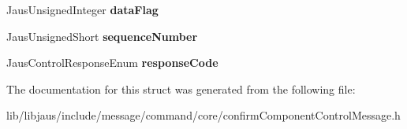 \begin{DoxyCompactItemize}
\item 
\hypertarget{struct_confirm_component_control_message_struct_aad81b36454527153ea84baa7b91dae07}{\-Jaus\-Unsigned\-Integer {\bfseries data\-Flag}}\label{struct_confirm_component_control_message_struct_aad81b36454527153ea84baa7b91dae07}

\item 
\hypertarget{struct_confirm_component_control_message_struct_afe74e35395cd6ae560fbf377fa5c1788}{\-Jaus\-Unsigned\-Short {\bfseries sequence\-Number}}\label{struct_confirm_component_control_message_struct_afe74e35395cd6ae560fbf377fa5c1788}

\item 
\hypertarget{struct_confirm_component_control_message_struct_a7ca4a7cce8c3d840541682aebb19a083}{\-Jaus\-Control\-Response\-Enum {\bfseries response\-Code}}\label{struct_confirm_component_control_message_struct_a7ca4a7cce8c3d840541682aebb19a083}

\end{DoxyCompactItemize}


\-The documentation for this struct was generated from the following file\-:\begin{DoxyCompactItemize}
\item 
lib/libjaus/include/message/command/core/confirm\-Component\-Control\-Message.\-h\end{DoxyCompactItemize}
